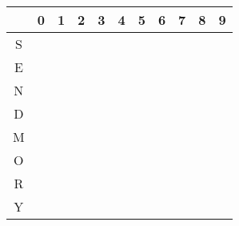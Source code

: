 \begin{tabular}{|c|c|c|c|c|c|c|c|c|c|c|}\hline
  & 0 & 1 & 2 & 3 & 4 & 5 & 6 & 7 & 8 & 9 \\ \hline
S &   &   &   &   &   &   &   &   &   &   \\ \hline
E &   &   &   &   &   &   &   &   &   &   \\ \hline
N &   &   &   &   &   &   &   &   &   &   \\ \hline
D &   &   &   &   &   &   &   &   &   &   \\ \hline
M &   &   &   &   &   &   &   &   &   &   \\ \hline
O &   &   &   &   &   &   &   &   &   &   \\ \hline
R &   &   &   &   &   &   &   &   &   &   \\ \hline
Y &   &   &   &   &   &   &   &   &   &   \\ \hline
\end{tabular}
